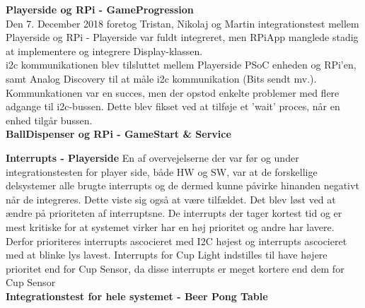 \documentclass[Rapport/Rapport_main.tex]{subfiles}
\begin{document}
\textbf{Playerside og RPi - GameProgression} \\
Den 7. December 2018 foretog Tristan, Nikolaj og Martin integrationstest mellem Playerside og RPi - Playerside var fuldt integreret, men RPiApp manglede stadig at implementere og integrere Display-klassen. \\
i2c kommunikationen blev tilsluttet mellem Playerside PSoC enheden og RPi'en, samt Analog Discovery til at måle i2c kommunikation (Bits sendt mv.). \\
Kommunkationen var en succes, men der opstod enkelte problemer med flere adgange til i2c-bussen. Dette blev fikset ved at tilføje et 'wait' proces, når en enhed tilgår bussen. \\ 
\textbf{BallDispenser og RPi - GameStart \& Service}

\textbf{Interrupts - Playerside}
En af overvejelserne der var før og under integrationstesten for player side, både HW og SW, var at de forskellige delsystemer alle brugte interrupts og de dermed kunne påvirke hinanden negativt når de integreres. Dette viste sig også at være tilfældet. Det blev løst ved at ændre på prioriteten af interruptsne. De interrupts der tager kortest tid og er mest kritiske for at systemet virker har en høj prioritet og andre har lavere. Derfor prioriteres interrupts ascocieret med I2C højest og interrupts ascocieret med at blinke lys lavest. Interrupts for Cup Light indstilles til have højere prioritet end for Cup Sensor, da disse interrupts er meget kortere end dem for Cup Sensor \\
\textbf{Integrationstest for hele systemet - Beer Pong Table}
\end{document}
